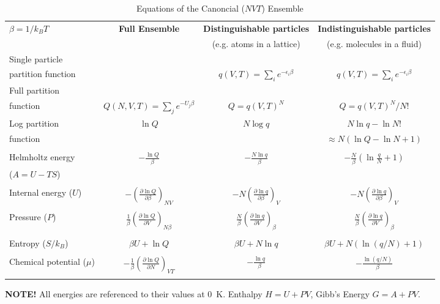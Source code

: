 \documentclass[11pt]{article}
\begin{document}
\begin{table}\small
  \begin{center}
    \caption{Equations of the Canoncial ($NVT$) Ensemble}
    \label{Canonical}
    \begin{tabular}[h]{lccc}
      \hline
$\beta=1/k_BT$ & {\bf Full Ensemble} & {\bf Distinguishable particles} & {\bf Indistinguishable
particles} \\
               &               & (e.g. atoms in a lattice) & (e.g. molecules in
               a fluid) \\
\hline
Single particle & & & \\partition function& & $\displaystyle q(V,T) = \sum_i
e^{-\epsilon_i\beta} $& $\displaystyle q(V,T) = \sum_i e^{-\epsilon_i\beta} $ \\
Full partition & & & \\function & $\displaystyle Q(N,V,T) = \sum_j e^{-U_j\beta} $ &
$\displaystyle Q = q(V,T)^N $ & $\displaystyle Q = q(V,T)^N/N! $ \\
Log partition &  $\ln Q$ & $N\log q$ & $ N\ln q - \ln N! $\\
function & & & $\approx N(\ln Q - \ln N +1)$ \\ & & & \\
Helmholtz energy & $\displaystyle -\frac{\ln Q}{\beta}$ & $\displaystyle
-\frac{N\ln q}{\beta}$ & $\displaystyle -\frac{N}{\beta}\left (\ln\frac{q}{N} +
  1 \right ) $ \\
($A=U-TS$) & & & \\ & & &  \\
Internal energy ($U$)& $\displaystyle -\left (\frac{\partial\ln
    Q}{\partial\beta}\right )_{NV}$ & $\displaystyle -N\left (\frac{\partial\ln
    q}{\partial\beta}\right )_{V}$ &  $\displaystyle -N\left (\frac{\partial\ln
    q}{\partial\beta}\right )_{V}$ \\ & & & \\
Pressure ($P$) & $\displaystyle  \frac{1}{\beta}\left (\frac{\partial\ln
    Q}{\partial V}\right )_{N\beta}$ & $\displaystyle \frac{N}{\beta}\left (\frac{\partial\ln
    q}{\partial V}\right )_{\beta}$ &  $\displaystyle \frac{N}{\beta}\left (\frac{\partial\ln
    q}{\partial V}\right )_{\beta}$ \\ & & & \\

Entropy ($S/k_B$) & $ \beta U + \ln Q$ & $\beta U + N \ln q$ & $\beta U +
N\left ( \ln(q/N) + 1\right )$ \\ & & & \\
Chemical potential ($\mu$) & $\displaystyle -\frac{1}{\beta}\left ( \frac{\partial \ln
    Q}{\partial N}\right )_{VT} $& $\displaystyle -\frac{\ln q}{\beta}$ & $\displaystyle
-\frac{\ln (q/N)}{\beta}$ \\ & & & \\
\hline
    \end{tabular}
{\bf NOTE!} All energies are referenced to their values at 0~K.  Enthalpy $H=U+PV$, Gibb's
Energy $G=A+PV$.
  \end{center}
\end{table}
\end{document}
